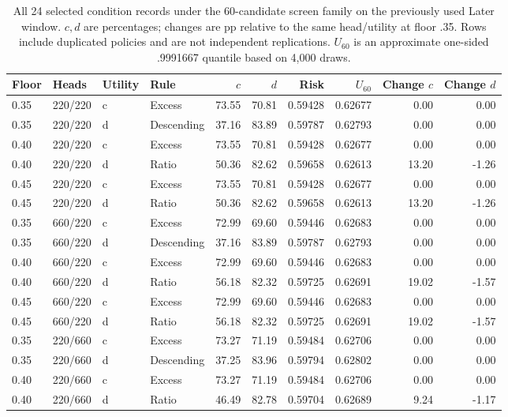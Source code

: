 \begin{table}[t]\centering\scriptsize
\caption{All 24 selected condition records under the 60-candidate screen family on the previously used Later window. $c,d$ are percentages; changes are pp relative to the same head/utility at floor .35. Rows include duplicated policies and are not independent replications. $U_{60}$ is an approximate one-sided .9991667 quantile based on 4,000 draws.}\label{tab:v8-floor-later}
\begin{tabular}{llllrrrrrr}\toprule
Floor & Heads & Utility & Rule & $c$ & $d$ & Risk & $U_{60}$ & Change $c$ & Change $d$\\\midrule
0.35 & 220/220 & c & Excess & 73.55 & 70.81 & 0.59428 & 0.62677 & 0.00 & 0.00 \\
0.35 & 220/220 & d & Descending & 37.16 & 83.89 & 0.59787 & 0.62793 & 0.00 & 0.00 \\
0.40 & 220/220 & c & Excess & 73.55 & 70.81 & 0.59428 & 0.62677 & 0.00 & 0.00 \\
0.40 & 220/220 & d & Ratio & 50.36 & 82.62 & 0.59658 & 0.62613 & 13.20 & -1.26 \\
0.45 & 220/220 & c & Excess & 73.55 & 70.81 & 0.59428 & 0.62677 & 0.00 & 0.00 \\
0.45 & 220/220 & d & Ratio & 50.36 & 82.62 & 0.59658 & 0.62613 & 13.20 & -1.26 \\
0.35 & 660/220 & c & Excess & 72.99 & 69.60 & 0.59446 & 0.62683 & 0.00 & 0.00 \\
0.35 & 660/220 & d & Descending & 37.16 & 83.89 & 0.59787 & 0.62793 & 0.00 & 0.00 \\
0.40 & 660/220 & c & Excess & 72.99 & 69.60 & 0.59446 & 0.62683 & 0.00 & 0.00 \\
0.40 & 660/220 & d & Ratio & 56.18 & 82.32 & 0.59725 & 0.62691 & 19.02 & -1.57 \\
0.45 & 660/220 & c & Excess & 72.99 & 69.60 & 0.59446 & 0.62683 & 0.00 & 0.00 \\
0.45 & 660/220 & d & Ratio & 56.18 & 82.32 & 0.59725 & 0.62691 & 19.02 & -1.57 \\
0.35 & 220/660 & c & Excess & 73.27 & 71.19 & 0.59484 & 0.62706 & 0.00 & 0.00 \\
0.35 & 220/660 & d & Descending & 37.25 & 83.96 & 0.59794 & 0.62802 & 0.00 & 0.00 \\
0.40 & 220/660 & c & Excess & 73.27 & 71.19 & 0.59484 & 0.62706 & 0.00 & 0.00 \\
0.40 & 220/660 & d & Ratio & 46.49 & 82.78 & 0.59704 & 0.62689 & 9.24 & -1.17 \\

\end{tabular}
\end{table}
